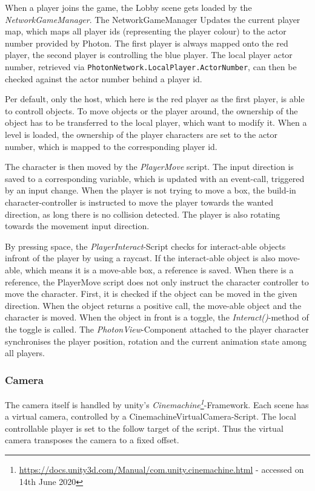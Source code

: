 When a player joins the game, the Lobby scene gets loaded by the \textit{NetworkGameManager}. The NetworkGameManager Updates the current player map, which maps all player ids (representing the player colour) to the actor number provided by Photon. The first player is always mapped onto the red player, the second player is controlling the blue player.
The local player actor number, retrieved via \texttt{PhotonNetwork.LocalPlayer.ActorNumber}, can then be checked against the actor number behind a player id.

Per default, only the host, which here is the red player as the first player, is able to controll objects. To move objects or the player around, the ownership of the object has to be transferred to the local player, which want to modify it.
When a level is loaded, the ownership of the player characters are set to the actor number, which is mapped to the corresponding player id.

The character is then moved by the \textit{PlayerMove} script.
The input direction is saved to a corresponding variable, which is updated with an event-call, triggered by an input change. When the player is not trying to move a box, the build-in character-controller is instructed to move the player towards the wanted direction, as long there is no collision detected.
The player is also rotating towards the movement input direction.

By pressing space, the \textit{PlayerInteract}-Script checks for interact-able objects infront of the player by using a raycast. If the interact-able object is also move-able, which means it is a move-able box, a reference is saved.
When there is a reference, the PlayerMove script does not only instruct the character controller to move the character. First, it is checked if the object can be moved in the given direction. When the object returns a positive call, the move-able object and the character is moved.
When the object in front is a toggle, the \textit{Interact()}-method of the toggle is called.
The \textit{PhotonView}-Component attached to the player character synchronises the player position, rotation and the current animation state among all players.


\subsubsection{Camera}

The camera itself is handled by unity's \textit{Cinemachine\footnote{\url{https://docs.unity3d.com/Manual/com.unity.cinemachine.html} - accessed on 14th June 2020}}-Framework.
Each scene has a virtual camera, controlled by a CinemachineVirtualCamera-Script. The local controllable player is set to the follow target of the script.
Thus the virtual camera transposes the camera to a fixed offset.

